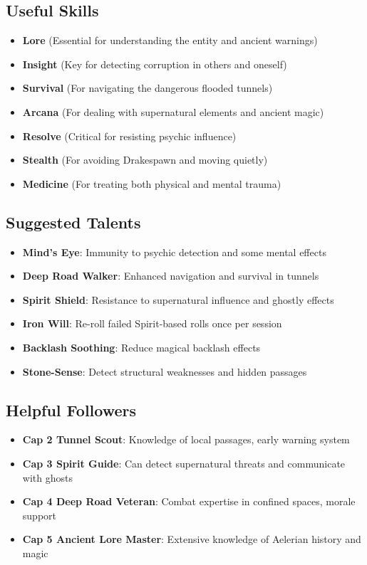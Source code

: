 \documentclass[11pt]{article}
\begin{document}
\begin{itemize}
{{{{{{{\subsection{Useful Skills}

\begin{itemize}
\item \textbf{Lore} (Essential for understanding the entity and ancient warnings)
\item \textbf{Insight} (Key for detecting corruption in others and oneself)
\item \textbf{Survival} (For navigating the dangerous flooded tunnels)
\item \textbf{Arcana} (For dealing with supernatural elements and ancient magic)
\item \textbf{Resolve} (Critical for resisting psychic influence)
\item \textbf{Stealth} (For avoiding Drakespawn and moving quietly)
\item \textbf{Medicine} (For treating both physical and mental trauma)
\end{itemize}

\subsection{Suggested Talents}

\begin{itemize}
\item \textbf{Mind's Eye}: Immunity to psychic detection and some mental effects
\item \textbf{Deep Road Walker}: Enhanced navigation and survival in tunnels
\item \textbf{Spirit Shield}: Resistance to supernatural influence and ghostly effects
\item \textbf{Iron Will}: Re-roll failed Spirit-based rolls once per session
\item \textbf{Backlash Soothing}: Reduce magical backlash effects
\item \textbf{Stone-Sense}: Detect structural weaknesses and hidden passages
\end{itemize}

\subsection{Helpful Followers}

\begin{itemize}
\item \textbf{Cap 2 Tunnel Scout}: Knowledge of local passages, early warning system
\item \textbf{Cap 3 Spirit Guide}: Can detect supernatural threats and communicate with ghosts
\item \textbf{Cap 4 Deep Road Veteran}: Combat expertise in confined spaces, morale support
\item \textbf{Cap 5 Ancient Lore Master}: Extensive knowledge of Aelerian history and magic
\end{itemize}

}}}}}}}
\end{itemize}
\end{document}

